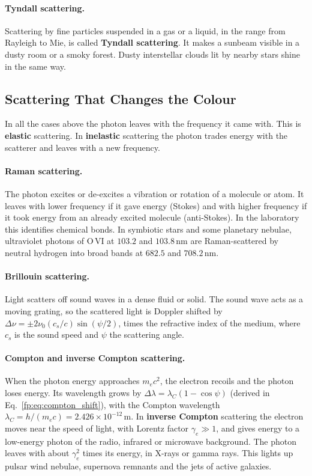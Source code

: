 \paragraph{Tyndall scattering.} Scattering by fine particles suspended in a gas or a liquid, in the range from Rayleigh to Mie, is called \textbf{Tyndall scattering}. It makes a sunbeam visible in a dusty room or a smoky forest. Dusty interstellar clouds lit by nearby stars shine in the same way.

\subsection{Scattering That Changes the Colour}

In all the cases above the photon leaves with the frequency it came with. This is \textbf{elastic} scattering. In \textbf{inelastic} scattering the photon trades energy with the scatterer and leaves with a new frequency.

\paragraph{Raman scattering.} The photon excites or de-excites a vibration or rotation of a molecule or atom. It leaves with lower frequency if it gave energy (Stokes) and with higher frequency if it took energy from an already excited molecule (anti-Stokes). In the laboratory this identifies chemical bonds. In symbiotic stars and some planetary nebulae, ultraviolet photons of $\mathrm{O\,VI}$ at $103.2$ and $103.8\,\mathrm{nm}$ are Raman-scattered by neutral hydrogen into broad bands at $682.5$ and $708.2\,\mathrm{nm}$.

\paragraph{Brillouin scattering.} Light scatters off sound waves in a dense fluid or solid. The sound wave acts as a moving grating, so the scattered light is Doppler shifted by $\Delta\nu=\pm2\nu_0(c_s/c)\sin(\psi/2)$, times the refractive index of the medium, where $c_s$ is the sound speed and $\psi$ the scattering angle.

\paragraph{Compton and inverse Compton scattering.} When the photon energy approaches $m_ec^2$, the electron recoils and the photon loses energy. Its wavelength grows by $\Delta\lambda=\lambda_C(1-\cos\psi)$ (derived in Eq.~\eqref{fp:eq:compton_shift}), with the Compton wavelength $\lambda_C=h/(m_ec)=2.426\times10^{-12}\,\mathrm m$. In \textbf{inverse Compton} scattering the electron moves near the speed of light, with Lorentz factor $\gamma_e\gg1$, and gives energy to a low-energy photon of the radio, infrared or microwave background. The photon leaves with about $\gamma_e^2$ times its energy, in X-rays or gamma rays. This lights up pulsar wind nebulae, supernova remnants and the jets of active galaxies.

